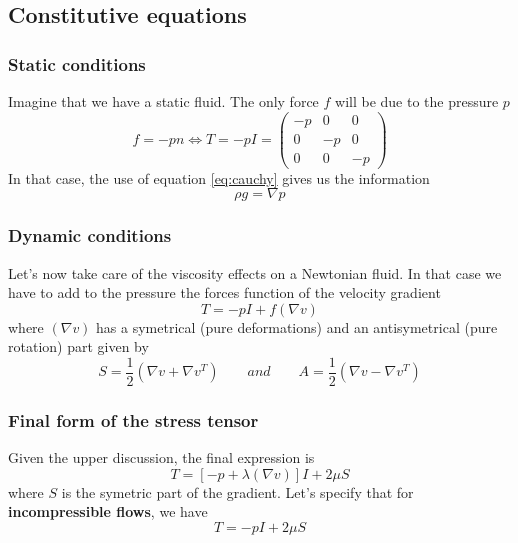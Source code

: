 	\subsection{Constitutive equations}
		\subsubsection{Static conditions}
			Imagine that we have a static fluid. The only force $f$ will be due to the pressure $p$ 
			\begin{equation}
				f = -pn \Leftrightarrow T = -pI = 
				\left(
				\begin{array}{ccc}
				-p & 0 & 0 \\ 
				0 & -p & 0 \\ 
				0 & 0 & -p
				\end{array} 
				\right)
			\end{equation}
			In that case, the use of equation \autoref{eq:cauchy} gives us the information
			\begin{equation}
				\rho g = \nabla p
			\end{equation}
			
		\subsubsection{Dynamic conditions}
			Let's now take care of the viscosity effects on a Newtonian fluid. In that case we have to add to the pressure the forces function of the velocity gradient 
			\begin{equation}
				T = -pI + f(\nabla v)
			\end{equation}
			where $(\nabla v)$ has a symetrical (pure deformations) and an antisymetrical (pure rotation) part given by
			\begin{equation}
				S = \frac{1}{2}(\nabla v + \nabla v ^T) \qquad and \qquad A = \frac{1}{2}(\nabla v - \nabla v ^T)
			\end{equation}
		
		\subsubsection{Final form of the stress tensor}
		Given the upper discussion, the final expression is 
		\begin{equation}
			T = \left[ -p + \lambda (\nabla v) \right]I + 2\mu S	
		\end{equation}		 
		where $S$ is the symetric part of the gradient. Let's specify that for \textbf{incompressible flows}, we have
		\begin{equation}
			T = -pI + 2\mu S
			\label{eq:incompressible}
		\end{equation}
		
